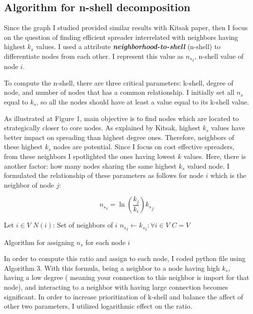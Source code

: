 \documentclass[11pt,a4,twocolumn]{article}
\begin{document}
\subsection{Algorithm for n-shell decomposition}

Since the graph I studied provided similar results with Kitsak paper, then I focus on the question of finding efficient spreader interrelated with neighbors having highest $k_{s}$ values. I used a attribute \textbf{\textit{neighborhood-to-shell}} (n-shell) to differentiate nodes from each other. I represent this value as ${n_{s}}_i$, n-shell value of node $i$.

To compute the n-shell, there are three critical parameters: k-shell, degree of node, and number of nodes that has a common relationship. I initially set all $n_{s}$ equal to $k_{s}$, so all the nodes should have at least a value equal to its k-shell value. 

As illustrated at Figure 1, main objective is to find nodes which are located to strategically closer to core nodes. As explained by Kitsak, highest $k_{s}$ values have better impact on spreading than highest degree ones. Therefore, neighbors of these highest $k_{s}$ nodes are potential. Since I focus on cost effective spreaders, from these neighbors I spotlighted the ones having lowest $k$ values. Here, there is another factor: how many nodes sharing the same highest $k_{s}$ valued node. I formulated the relationship of these parameters as follows for node $i$ which is the neighbor of node $j$:

\[
{n_{s}}_i = \ln{(\frac{k_{j}}{k_{i}})}{k_{s}}_j
\]

\begin{algorithm}
\SetAlgoLined
{}
Let $i \in V$\;
$N(i)$: Set of neighbors of $i$\;
${n_{s}}_i\gets {k_{s}}_i : \forall i \in V $\;
$C = V$ \;
 \caption{Algorithm for assigning $n_{s}$ for each node $i$}
\end{algorithm}

In order to compute this ratio and assign to each node, I coded python file using Algorithm 3. 
With this formula, being a neighbor to a node having high $k_{s}$, having a low degree ( meaning your connection to this neighbor is import for that node), and interacting to a neighbor with having large connection becomes significant. In order to increase prioritization of k-shell and balance the affect of other two parameters, I utilized logarithmic effect on the ratio.
\end{document}

